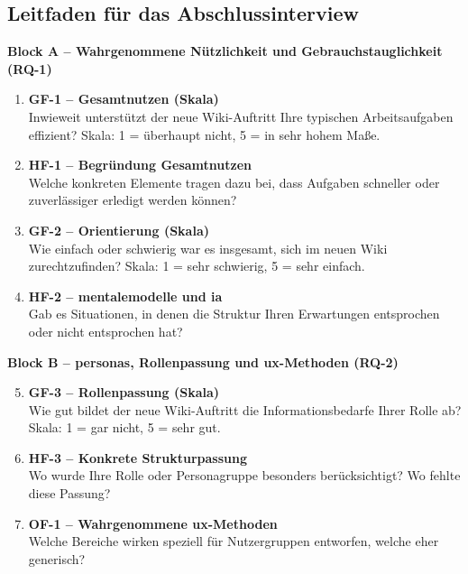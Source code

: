 
\subsection{Leitfaden für das Abschlussinterview}

\textbf{Block A -- Wahrgenommene Nützlichkeit und Gebrauchstauglichkeit (RQ-1)}

\begin{enumerate}
  \item \textbf{GF-1 -- Gesamtnutzen (Skala)}\\
        Inwieweit unterstützt der neue Wiki-Auftritt Ihre typischen Arbeitsaufgaben effizient?
        Skala: 1 = überhaupt nicht, 5 = in sehr hohem Maße.

  \item \textbf{HF-1 -- Begründung Gesamtnutzen}\\
        Welche konkreten Elemente tragen dazu bei, dass Aufgaben schneller oder zuverlässiger erledigt werden können?

  \item \textbf{GF-2 -- Orientierung (Skala)}\\
        Wie einfach oder schwierig war es insgesamt, sich im neuen Wiki zurechtzufinden?
        Skala: 1 = sehr schwierig, 5 = sehr einfach.

  \item \textbf{HF-2 -- \Gls{mentalemodelle} und \Gls{ia}}\\
        Gab es Situationen, in denen die Struktur Ihren Erwartungen entsprochen oder nicht entsprochen hat?
\end{enumerate}

\newpage
\textbf{Block B -- \Gls{personas}, Rollenpassung und \Gls{ux}-Methoden (RQ-2)}

\begin{enumerate}
  \setcounter{enumi}{4}
  \item \textbf{GF-3 -- Rollenpassung (Skala)}\\
        Wie gut bildet der neue Wiki-Auftritt die Informationsbedarfe Ihrer Rolle ab?
        Skala: 1 = gar nicht, 5 = sehr gut.

  \item \textbf{HF-3 -- Konkrete Strukturpassung}\\
        Wo wurde Ihre Rolle oder Personagruppe besonders berücksichtigt?
        Wo fehlte diese Passung?

  \item \textbf{OF-1 -- Wahrgenommene \Gls{ux}-Methoden}\\
        Welche Bereiche wirken speziell für Nutzergruppen entworfen, welche eher generisch?
\end{enumerate}

